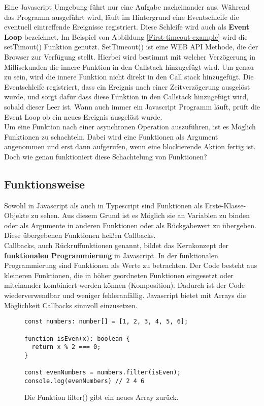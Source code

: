 \noindent
Eine Javascript Umgebung führt nur eine Aufgabe nacheinander aus. Während das Programm ausgeführt wird, läuft im Hintergrund eine Eventschleife die eventuell eintreffende Ereignisse registriert. Diese Schleife wird auch als \textbf{Event Loop} bezeichnet. Im Beispiel von Abbildung \ref{First-timeout-example} wird die setTimout() Funktion genutzt. SetTimeout() ist eine WEB API Methode, die der Browser zur Verfügung stellt. Hierbei wird bestimmt mit welcher Verzögerung in Millisekunden die innere Funktion in den Callstack hinzugefügt wird. Um genau zu sein, wird die innere Funktion nicht direkt in den Call stack hinzugefügt. Die Eventschleife registriert, dass ein Ereignis nach einer Zeitverzögerung ausgelöst wurde, und sorgt dafür dass diese Funktion in den Callstack hinzugefügt wird, sobald dieser Leer ist. Wann auch immer ein Javascript Programm läuft, prüft die Event Loop ob ein neues Ereignis ausgelöst wurde\cite{regular-event-loop}.\\

\noindent
Um eine Funktion nach einer asynchronen Operation auszuführen, ist es Möglich Funktionen zu schachteln. Dabei wird eine Funktionen als Argument angenommen und erst dann aufgerufen, wenn eine blockierende Aktion fertig ist. Doch wie genau funktioniert diese Schachtelung von Funktionen?

\subsection{Funktionsweise}

Sowohl in Javascript als auch in Typescript sind Funktionen als Erste-Klasse-Objekte zu sehen. Aus diesem Grund ist es Möglich sie an Variablen zu binden oder als Argumente in anderen Funktionen oder als Rückgabewert zu übergeben. Diese übergebenen Funktionen heißen Callbacks.\\

\noindent
Callbacks, auch Rückruffunktionen genannt, bildet das Kernkonzept der \textbf{funktionalen Programmierung} in Javascript.\cite{callbacks-intro} In der funktionalen Programmierung sind Funktionen als Werte zu betrachten. Der Code besteht aus kleineren Funktionen, die in höher geordneten Funktionen eingesetzt oder miteinander kombiniert werden können (Komposition). Dadurch ist der Code wiederverwendbar und weniger fehleranfällig. Javascript bietet mit Arrays die Möglichkeit Callbacks sinnvoll einzusetzen.

\begin{figure}[H]
\begin{lstlisting}[basicstyle=\small]
const numbers: number[] = [1, 2, 3, 4, 5, 6];

function isEven(x): boolean { 
  return x % 2 === 0; 
}

const evenNumbers = numbers.filter(isEven);
console.log(evenNumbers) // 2 4 6
\end{lstlisting}
\caption{Die Funktion filter() gibt ein neues Array zurück.}
\label{callbacks-with-arrays}
\end{figure}

